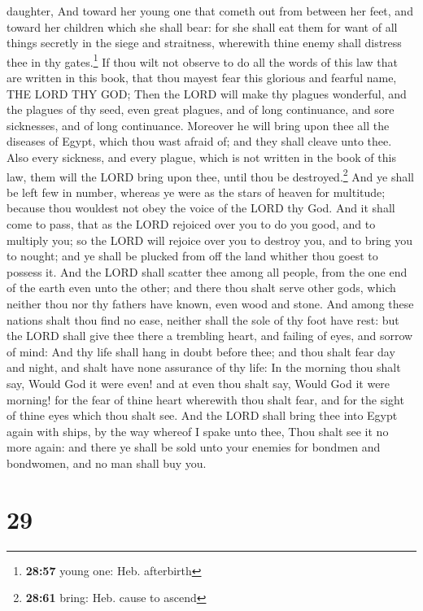 daughter,  And toward her young one that cometh out from
between her feet, and toward her children which she shall bear: for she
shall eat them for want of all things secretly in the siege and
straitness, wherewith thine enemy shall distress thee in thy
gates.\footnote{\textbf{28:57} young one: Heb. afterbirth}
 If thou wilt not observe to do all the words of this law
that are written in this book, that thou mayest fear this glorious and
fearful name, THE LORD THY GOD;  Then the LORD will make
thy plagues wonderful, and the plagues of thy seed, even great plagues,
and of long continuance, and sore sicknesses, and of long continuance.
 Moreover he will bring upon thee all the diseases of
Egypt, which thou wast afraid of; and they shall cleave unto thee.
 Also every sickness, and every plague, which is not
written in the book of this law, them will the LORD bring upon thee,
until thou be destroyed.\footnote{\textbf{28:61} bring: Heb. cause to
  ascend}  And ye shall be left few in number, whereas ye
were as the stars of heaven for multitude; because thou wouldest not
obey the voice of the LORD thy God.  And it shall come to
pass, that as the LORD rejoiced over you to do you good, and to multiply
you; so the LORD will rejoice over you to destroy you, and to bring you
to nought; and ye shall be plucked from off the land whither thou goest
to possess it.  And the LORD shall scatter thee among all
people, from the one end of the earth even unto the other; and there
thou shalt serve other gods, which neither thou nor thy fathers have
known, even wood and stone.  And among these nations
shalt thou find no ease, neither shall the sole of thy foot have rest:
but the LORD shall give thee there a trembling heart, and failing of
eyes, and sorrow of mind:  And thy life shall hang in
doubt before thee; and thou shalt fear day and night, and shalt have
none assurance of thy life:  In the morning thou shalt
say, Would God it were even! and at even thou shalt say, Would God it
were morning! for the fear of thine heart wherewith thou shalt fear, and
for the sight of thine eyes which thou shalt see.  And
the LORD shall bring thee into Egypt again with ships, by the way
whereof I spake unto thee, Thou shalt see it no more again: and there ye
shall be sold unto your enemies for bondmen and bondwomen, and no man
shall buy you.

\hypertarget{section-28}{%
\section{29}\label{section-28}}

